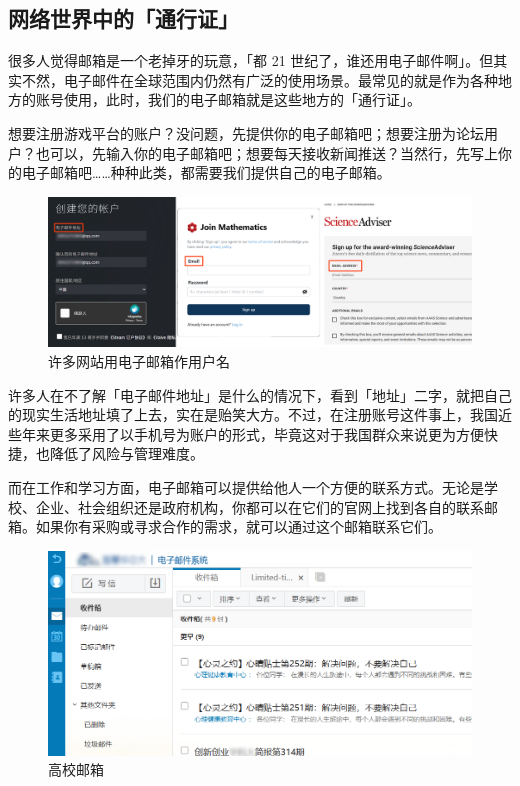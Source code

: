 \subsection{网络世界中的「通行证」}

很多人觉得邮箱是一个老掉牙的玩意，「都 21 世纪了，谁还用电子邮件啊」。但其实不然，电子邮件在全球范围内仍然有广泛的使用场景。最常见的就是作为各种地方的账号使用，此时，我们的电子邮箱就是这些地方的「通行证」。

想要注册游戏平台的账户？没问题，先提供你的电子邮箱吧；想要注册为论坛用户？也可以，先输入你的电子邮箱吧；想要每天接收新闻推送？当然行，先写上你的电子邮箱吧……种种此类，都需要我们提供自己的电子邮箱。

\begin{figure}[htb!]
  \centering
  \includegraphics[width=.8\textwidth]{assets/software/Email_As_Account.png}
  \caption{许多网站用电子邮箱作用户名}
  \label{fig:Email_As_Account}
\end{figure}

\begin{note}
  许多人在不了解「电子邮件地址」是什么的情况下，看到「地址」二字，就把自己的现实生活地址填了上去，实在是贻笑大方。不过，在注册账号这件事上，我国近些年来更多采用了以手机号为账户的形式，毕竟这对于我国群众来说更为方便快捷，也降低了风险与管理难度。
\end{note}

而在工作和学习方面，电子邮箱可以提供给他人一个方便的联系方式。无论是学校、企业、社会组织还是政府机构，你都可以在它们的官网上找到各自的联系邮箱。如果你有采购或寻求合作的需求，就可以通过这个邮箱联系它们。

\begin{figure}[htb!]
  \centering
  \includegraphics[width=.8\textwidth]{assets/software/HUST_Mailbox.png}
  \caption{高校邮箱}
  \label{fig:HUST_Mailbox}
\end{figure}

